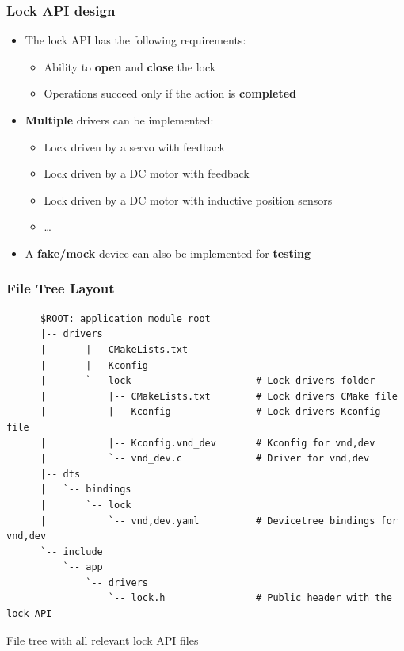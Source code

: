\documentclass[handout]{beamer}
\begin{document}
\begin{frame}
  \frametitle{Lock API design}

  \begin{itemize}
    \item The lock API has the following requirements:
          \begin{itemize}
            \item Ability to \textbf{open} and \textbf{close} the lock
            \item Operations succeed only if the action is \textbf{completed}
          \end{itemize}
    \item \textbf{Multiple} drivers can be implemented:
          \begin{itemize}
            \item Lock driven by a servo with feedback
            \item Lock driven by a DC motor with feedback
            \item Lock driven by a DC motor with inductive position sensors
            \item \ldots
          \end{itemize}
    \item A \textbf{fake/mock} device can also be implemented for
          \textbf{testing}
  \end{itemize}
\end{frame}

\begin{frame}[fragile]
  \frametitle{File Tree Layout}

  \begin{listing}[H]
    \begin{verbatim}
      $ROOT: application module root
      |-- drivers
      |       |-- CMakeLists.txt
      |       |-- Kconfig
      |       `-- lock                      # Lock drivers folder
      |           |-- CMakeLists.txt        # Lock drivers CMake file
      |           |-- Kconfig               # Lock drivers Kconfig file
      |           |-- Kconfig.vnd_dev       # Kconfig for vnd,dev
      |           `-- vnd_dev.c             # Driver for vnd,dev
      |-- dts
      |   `-- bindings
      |       `-- lock
      |           `-- vnd,dev.yaml          # Devicetree bindings for vnd,dev
      `-- include
          `-- app
              `-- drivers
                  `-- lock.h                # Public header with the lock API
    \end{verbatim}
    \caption{File tree with all relevant lock API files}
  \end{listing}
\end{frame}
\end{document}
